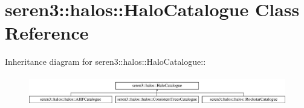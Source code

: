 \hypertarget{classseren3_1_1halos_1_1HaloCatalogue}{
\section{seren3::halos::HaloCatalogue Class Reference}
\label{classseren3_1_1halos_1_1HaloCatalogue}
}
Inheritance diagram for seren3::halos::HaloCatalogue::\begin{figure}[H]
\begin{center}
\leavevmode
\includegraphics[height=1.31455cm]{classseren3_1_1halos_1_1HaloCatalogue}
\end{center}
\end{figure}
